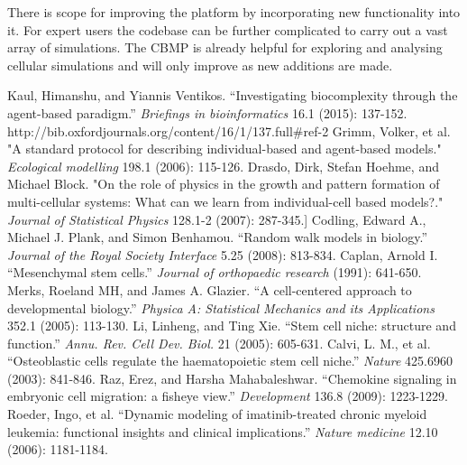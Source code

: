 \documentclass[12pt]{article}
\begin{document}
There is scope for improving the platform by incorporating new functionality into it. For expert users 
the codebase can be further complicated to carry out a vast array of simulations. The CBMP is already 
helpful for exploring and analysing cellular simulations and will only improve as new additions are made. 

\newpage

\begin{thebibliography}{99}
  Kaul, Himanshu, and Yiannis Ventikos. ``Investigating biocomplexity through the agent-based paradigm.'' {\itshape Briefings in bioinformatics} 16.1 (2015): 137-152. http://bib.oxfordjournals.org/content/16/1/137.full\#ref-2
 Grimm, Volker, et al. "A standard protocol for describing individual-based and agent-based models." {\itshape Ecological modelling} 198.1 (2006): 115-126.
 Drasdo, Dirk, Stefan Hoehme, and Michael Block. "On the role of physics in the growth and pattern formation of multi-cellular systems: What can we learn from individual-cell based models?." {\itshape Journal of Statistical Physics} 128.1-2 (2007): 287-345.]
  Codling, Edward A., Michael J. Plank, and Simon Benhamou. ``Random walk models in biology.'' {\itshape Journal of the Royal Society Interface} 5.25 (2008): 813-834.
  Caplan, Arnold I. ``Mesenchymal stem cells.'' {\itshape Journal of orthopaedic research} (1991): 641-650.
  Merks, Roeland MH, and James A. Glazier. ``A cell-centered approach to developmental biology.'' {\itshape Physica A: Statistical Mechanics and its Applications} 352.1 (2005): 113-130.
  Li, Linheng, and Ting Xie. ``Stem cell niche: structure and function.'' {\itshape Annu. Rev. Cell Dev. Biol.} 21 (2005): 605-631.
  Calvi, L. M., et al. ``Osteoblastic cells regulate the haematopoietic stem cell niche.'' {\itshape Nature} 425.6960 (2003): 841-846.
  Raz, Erez, and Harsha Mahabaleshwar. ``Chemokine signaling in embryonic cell migration: a fisheye view.'' {\itshape Development} 136.8 (2009): 1223-1229.
  Roeder, Ingo, et al. ``Dynamic modeling of imatinib-treated chronic myeloid leukemia: functional insights and clinical implications.'' {\itshape Nature medicine} 12.10 (2006): 1181-1184.
\end{thebibliography}

\end{document}
